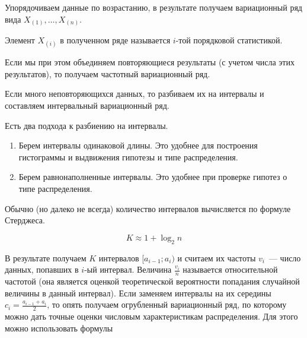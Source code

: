 

Упорядочиваем данные по возрастанию, в результате получаем вариационный ряд вида
\(X_{(1)}, \dotsc, X_{(n)}\).

\begin{definition}
  Элемент \(X_{(i)}\) в полученном ряде называется \(i\)-той порядковой
  статистикой.
\end{definition}

\begin{remark}
  Если мы при этом объединяем повторяющиеся результаты (с учетом числа этих
  результатов), то получаем частотный вариационный ряд.
\end{remark}


Если много неповторяющихся данных, то разбиваем их на интервалы и составляем
интервальный вариационный ряд.

\begin{remark}
  Есть два подхода к разбиению на интервалы.

  \begin{enumerate}
  \item
    Берем интервалы одинаковой длины. Это удобнее для построения гистограммы и
    выдвижения гипотезы и типе распределения.

  \item
    Берем равнонаполненные интервалы. Это удобнее при проверке гипотез о типе
    распределения.
  \end{enumerate}
\end{remark}

\begin{remark}
  Обычно (но далеко не всегда) количество интервалов вычисляется по формуле
  Стерджеса.

  \begin{equation*}
    K \approx 1 + \log_2 n
  \end{equation*}
\end{remark}

В результате получаем \(K\) интервалов \([a_{i - 1}; a_i)\) и считаем их
частоты \(v_i\)~--- число данных, попавших в \(i\)-ый интервал. Величина
\(\frac{v_i}{n}\) называется относительной частотой (она является оценкой
теоретической вероятности попадания случайной величины в данный интервал). Если
заменяем интервалы на их середины \(c_i = \frac{a_{i - 1} + a_i}{2}\), то опять
получаем огрубленный вариационный ряд, по которому можно дать точные оценки
числовым характеристикам распределения. Для этого можно использовать формулы

